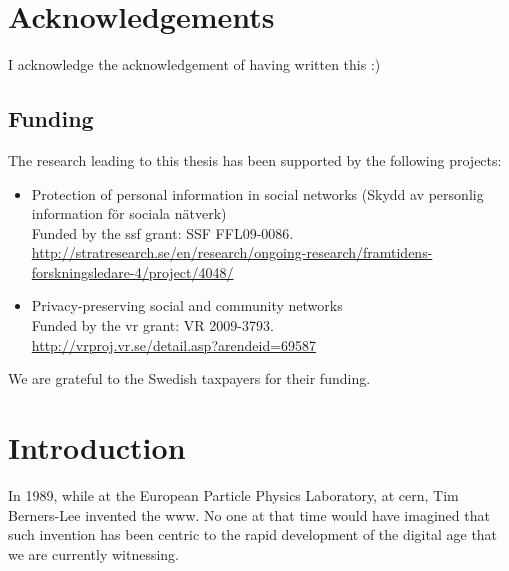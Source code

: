 \documentclass[showtrims]{kthesis}
\begin{document}
\frontmatter
% 
\clearpage
\chapter*{Acknowledgements}
I acknowledge the acknowledgement of having written this :)

\section*{Funding}
The research leading to this thesis has been supported by the following projects:
\begin{itemize}
    \item Protection of personal information in social networks (Skydd av personlig information f{\"o}r sociala n{\"a}tverk)\\
    Funded by the \ac{ssf} grant: SSF FFL09-0086.\\
    \url{http://stratresearch.se/en/research/ongoing-research/framtidens-forskningsledare-4/project/4048/}
    \item Privacy-preserving social and community networks\\
    Funded by the \ac{vr} grant: VR 2009-3793.\\
    \url{http://vrproj.vr.se/detail.asp?arendeid=69587}
\end{itemize}

We are grateful to the Swedish taxpayers for their funding.

\clearpage
{}
\tableofcontents
\mainmatter
\chapter{Introduction}
In 1989, while at the European Particle Physics Laboratory, at \ac{cern}, Tim Berners-Lee 
invented the \Ac{www}. No one at that time would have imagined that such invention 
has been centric to the rapid development of the digital age that we are currently 
witnessing.
\end{document}

